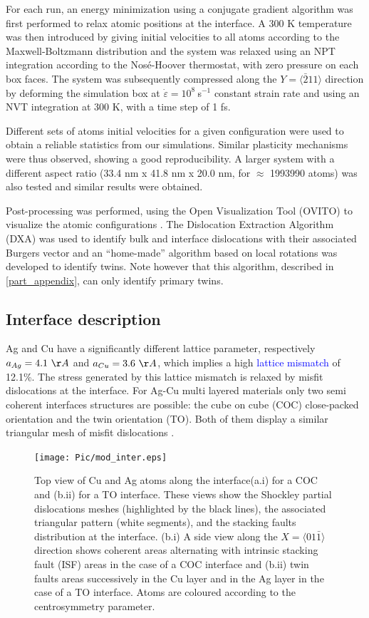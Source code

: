 \documentclass[final,3p,times,twocolumn]{elsarticle}
\begin{document}
For each run, an energy minimization using a conjugate gradient algorithm was first performed to relax atomic positions at the interface. A 300 K temperature was then introduced by giving initial velocities to all atoms according to the Maxwell-Boltzmann distribution and the system was relaxed using an NPT integration according to the Nosé-Hoover thermostat, with zero pressure on each box faces. The system was subsequently compressed along the $Y=\langle\bar{2}11\rangle$ direction by deforming the simulation box at $\dot{\varepsilon}=10^{8}~$s$^{-1}$ constant strain rate and using an NVT integration at 300 K, with a time step of 1 fs.

Different sets of atoms initial velocities for a given configuration were used to obtain a reliable statistics from our simulations. Similar plasticity mechanisms were thus observed, showing a good reproducibility. A larger system with a different aspect ratio (33.4 nm x 41.8 nm x 20.0 nm, for $\approx$ 1993990 atoms) was also tested and similar results were obtained. 

Post-processing was performed, using the Open Visualization Tool (OVITO) to visualize the atomic configurations \cite{stukowski10MSMSE1}. The Dislocation Extraction Algorithm (DXA) was used to identify bulk and interface dislocations with their associated Burgers vector and an ``home-made'' algorithm based on local rotations was developed to identify twins. Note however that this algorithm, described in \ref{part_appendix}, can only identify primary twins.

	\subsection{Interface description}
	\label{subpart_interface}
 
Ag and Cu have a significantly different lattice parameter, respectively $a_{Ag}=4.1~\AA$ and $a_{Cu}=3.6~\AA$, which implies a high \textcolor{blue}{lattice mismatch} of 12.1\%. The stress generated by this lattice mismatch is relaxed by misfit dislocations at the interface. For Ag-Cu multi layered materials only two semi coherent interfaces structures are possible: the cube on cube (COC) close-packed orientation and the twin orientation (TO). Both of them display a similar triangular mesh of misfit dislocations \cite{wang11SM,an15APL}.
\begin{figure}[!h]
	\begin{center}
		\texttt{[image: Pic/mod\_inter.eps]} 
	\end{center}
	\caption{Top view of Cu and Ag atoms along the interface(a.i) for a COC and (b.ii) for a TO interface. These views show the Shockley partial dislocations meshes (highlighted by the black lines), the associated triangular pattern (white segments), and the stacking faults distribution at the interface. (b.i) A side view along the $X=\langle01\bar{1}\rangle$ direction shows coherent areas alternating with intrinsic stacking fault (ISF) areas in the case of a COC interface and (b.ii) twin faults areas successively in the Cu layer and in the Ag layer in the case of a TO interface. Atoms are coloured according to the centrosymmetry parameter.}\label{fig_mod_inter}
\end{figure}
\end{document}

